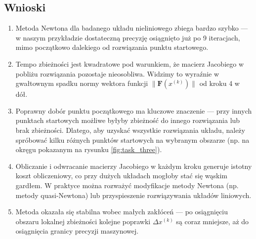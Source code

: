 \documentclass[a4paper,12pt]{article}
\begin{document}
\subsection*{Wnioski}

\begin{enumerate}
  \item Metoda Newtona dla badanego układu nieliniowego zbiega bardzo szybko — w naszym przykładzie dostateczną precyzję osiągnięto już po 9 iteracjach, mimo początkowo dalekiego od rozwiązania punktu startowego.
  \item Tempo zbieżności jest kwadratowe pod warunkiem, że macierz Jacobiego w pobliżu rozwiązania pozostaje nieosobliwa. Widzimy to wyraźnie w gwałtownym spadku normy wektora funkcji \(\|\mathbf F(x^{(k)})\|\) od kroku 4 w dół.
  \item Poprawny dobór punktu początkowego ma kluczowe znaczenie — przy innych punktach startowych możliwe byłyby zbieżność do innego rozwiązania lub brak zbieżności. Dlatego, aby uzyskać wszystkie rozwiązania układu, należy spróbować kilku różnych punktów startowych na wybranym obszarze (np. na okręgu pokazanym na rysunku \ref{fig:task_three}).
  \item Obliczanie i odwracanie macierzy Jacobiego w każdym kroku generuje istotny koszt obliczeniowy, co przy dużych układach mogłoby stać się wąskim gardłem. W praktyce można rozważyć modyfikacje metody Newtona (np. metody quasi-Newtona) lub przyspieszenie rozwiązywania układów liniowych.
  \item Metoda okazała się stabilna wobec małych zakłóceń — po osiągnięciu obszaru lokalnej zbieżności kolejne poprawki \(\Delta x^{(k)}\) są coraz mniejsze, aż do osiągnięcia granicy precyzji maszynowej.
\end{enumerate}




\end{document}
